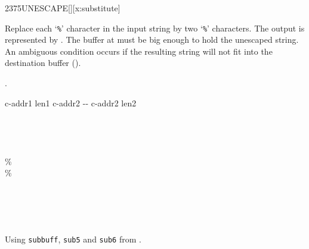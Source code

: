 \begin{worddef}{2375}{UNESCAPE}[][x:substitute]
\item {}

	Replace each `\texttt{\%}' character in the input string
	 by two `\texttt{\%}' characters.  The output
	is represented by .  The buffer at 
	must be big enough to hold the unescaped string.  An ambiguous
	condition occurs if the resulting string will not fit into the
	destination buffer ().

\see {}.

	\begin{implement}
		\word{:}   c-addr1 len1 c-addr2 -{}- c-addr2 len2 \\
		  \\
		  \\
		  \\
		\tab {}    \word{+}   \\
		\tab[2]   \word{[CHAR]} \% \word{=}  \\
		\tab[3] \word{[CHAR]} \%    \\
		\tab[2]  \\
		\tab[2]      \\
		\tab {} \\
		\tab {} \word{-} \\
		\word{;}
	\end{implement}

	\begin{testing}
		Using \texttt{subbuff}, \texttt{sub5} and \texttt{sub6} from .

	\end{testing}
\end{worddef}
\endinput
